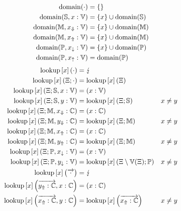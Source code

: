 \newcommand{\Fail}{\lightning}
\newcommand{\Lookup}[2]{\operatorname{lookup}\left[#1\right]\left(#2\right)}
\newcommand{\Domain}{\operatorname{domain}}
\begin{equation*}
\begin{aligned}
\Domain(\cdot) &= \{\}\\
\Domain(\Scope, x : \Var) &= \{x\} \cup \Domain(\Scope)\\
\Domain(\Module, \Private{x} : \Var) &= \{x\} \cup \Domain(\Module)\\
\Domain(\Module, \Public{x} : \Var) &= \{x\} \cup \Domain(\Module)\\
\Domain(\Pattern, \private{x} : \Var) &= \{x\} \cup \Domain(\Pattern)\\
\Domain(\Pattern, \public{x} : \Var) &= \Domain(\Pattern)
\end{aligned}
\end{equation*}
\begin{equation*}
\begin{aligned}
\Lookup{x}{\cdot} &= \Fail\\
\Lookup{x}{\Env; \cdot} &= \Lookup{x}{\Env}\\
\Lookup{x}{\Env; \Scope, x : \Var} &= (x : \Var)\\
\Lookup{x}{\Env; \Scope, y : \Var} &= \Lookup{x}{\Env; \Scope} & x \neq y\\
\Lookup{x}{\Env; \Module, \Private{x} : \Constant} &= (x : \Constant)\\
\Lookup{x}{\Env; \Module, \Private{y} : \Constant} &= \Lookup{x}{\Env; \Module} & x \neq y\\
\Lookup{x}{\Env; \Module, \Public{x} : \Constant} &= (x : \Constant)\\
\Lookup{x}{\Env; \Module, \Public{y} : \Constant} &= \Lookup{x}{\Env; \Module} & x \neq y\\
\Lookup{x}{\Env; \Pattern, \private{x} : \Var} &= (x : \Var)\\
\Lookup{x}{\Env; \Pattern, \private{y} : \Var} &= \Lookup{x}{\Env \setminus \Var(\Env); \Pattern} & x \neq y\\
\Lookup{x}{\overrightarrow{\cdot}} &= \Fail\\
\Lookup{x}{\overrightarrow{\Public{y} : \Constant}, x : \Constant} &= (x : \Constant)\\
\Lookup{x}{\overrightarrow{\Public{x} : \Constant}, y : \Constant} &= \Lookup{x}{\overrightarrow{\Public{x} : \Constant}} & x \neq y
\end{aligned}
\end{equation*}

